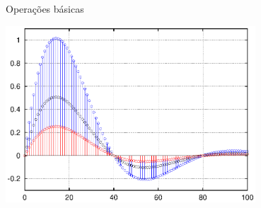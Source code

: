 \documentclass[
size=17pt,
paper=smartboard,
mode=present,
display=slidesnotes,
style=sailor,
nopagebreaks,
blackslide,
fleqn]{powerdot}
\begin{document}
\begin{slide}[toc=]{Operações básicas}
\begin{itemize}
{                          \includegraphics[width=0.7\textwidth]{figs/multConst.eps} }
  \end{itemize}
\end{slide}
\end{document}
